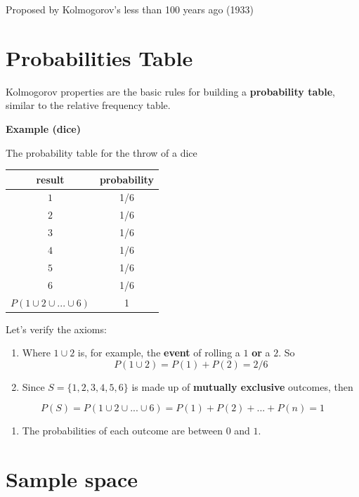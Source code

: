 \documentclass[
]{book}
\providecommand{\tightlist}{%
  \setlength{\itemsep}{0pt}\setlength{\parskip}{0pt}}
\begin{document}
Proposed by Kolmogorov's less than 100 years ago (1933)

\hypertarget{probabilities-table}{%
\section{Probabilities Table}\label{probabilities-table}}

Kolmogorov properties are the basic rules for building a \textbf{probability table}, similar to the relative frequency table.

\textbf{Example (dice)}

The probability table for the throw of a dice

\begin{longtable}[]{@{}cc@{}}
\toprule\noalign{}
result & probability \\
\midrule\noalign{}
\endhead
\bottomrule\noalign{}
\endlastfoot
\(1\) & 1/6 \\
\(2\) & 1/6 \\
\(3\) & 1/6 \\
\(4\) & 1/6 \\
\(5\) & 1/6 \\
\(6\) & 1/6 \\
\(P( 1 \cup 2\cup ... \cup 6)\) & 1 \\
\end{longtable}

Let's verify the axioms:

\begin{enumerate}
\def\labelenumi{\arabic{enumi})}
\item
  Where \(1 \cup 2\) is, for example, the \textbf{event} of rolling a \(1\) \textbf{or} a \(2\). So \[ P( 1 \cup 2)=P(1)+P(2)=2/6\]
\item
  Since \(S= \{ 1,2,3,4,5,6\}\) is made up of \textbf{mutually exclusive} outcomes, then
\end{enumerate}

\[P(S)=P(1\cup 2\cup ... \cup 6) = P(1)+P(2)+ ...+P(n)=1\]

\begin{enumerate}
\def\labelenumi{\arabic{enumi})}
\setcounter{enumi}{2}
\tightlist
\item
  The probabilities of each outcome are between \(0\) and \(1\).
\end{enumerate}

\hypertarget{sample-space}{%
\section{Sample space}\label{sample-space}}
\end{document}

